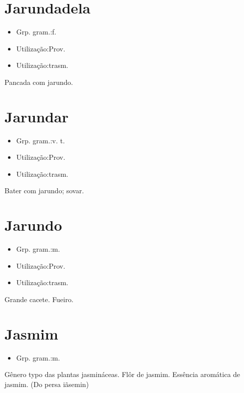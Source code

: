 \documentclass{article}
\begin{document}
\section{Jarundadela}
\begin{itemize}
\item {Grp. gram.:f.}
\end{itemize}
\begin{itemize}
\item {Utilização:Prov.}
\end{itemize}
\begin{itemize}
\item {Utilização:trasm.}
\end{itemize}
Pancada com jarundo.
\section{Jarundar}
\begin{itemize}
\item {Grp. gram.:v. t.}
\end{itemize}
\begin{itemize}
\item {Utilização:Prov.}
\end{itemize}
\begin{itemize}
\item {Utilização:trasm.}
\end{itemize}
Bater com jarundo; sovar.
\section{Jarundo}
\begin{itemize}
\item {Grp. gram.:m.}
\end{itemize}
\begin{itemize}
\item {Utilização:Prov.}
\end{itemize}
\begin{itemize}
\item {Utilização:trasm.}
\end{itemize}
Grande cacete.
Fueiro.
\section{Jasmim}
\begin{itemize}
\item {Grp. gram.:m.}
\end{itemize}
Gênero typo das plantas jasmináceas.
Flôr de jasmim.
Essência aromática de jasmim.
(Do persa \textunderscore iãsemin\textunderscore )
\end{document}

